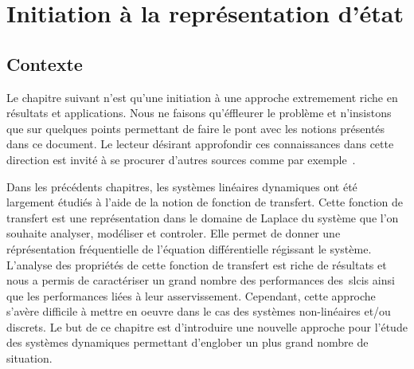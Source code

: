 \chapter[Représentation d'état]
{Initiation à la représentation d'état\label{chap-repreEtat}}
\minitoc
\newpage
\section{Contexte}
Le chapitre suivant n'est qu'une initiation à une approche extremement riche
en résultats et applications. Nous ne faisons qu'éffleurer le problème et 
n'insistons que sur quelques points permettant de faire le pont avec les
notions présentés dans ce document. Le lecteur désirant approfondir 
ces connaissances dans cette direction est invité à se procurer d'autres 
sources comme par exemple~\cite{Bachelier}. 


Dans les précédents chapitres, les systèmes linéaires dynamiques ont été 
largement étudiés à l'aide de la notion de fonction de transfert. Cette fonction
de transfert est une représentation dans le domaine de Laplace du système que
l'on souhaite analyser, modéliser et controler. Elle permet de donner
une réprésentation fréquentielle de l'équation différentielle régissant le 
système. L'analyse des propriétés de cette fonction de transfert est riche de
résultats et nous a permis de caractériser un grand nombre des performances
des~\glspl{slci} ainsi que les performances liées à leur asservissement. 
Cependant, cette approche s'avère difficile à mettre en oeuvre dans le cas 
des systèmes non-linéaires et/ou discrets. Le but de ce chapitre est 
d'introduire une nouvelle approche  pour l'étude des systèmes dynamiques 
permettant d'englober un plus grand nombre de situation. 

